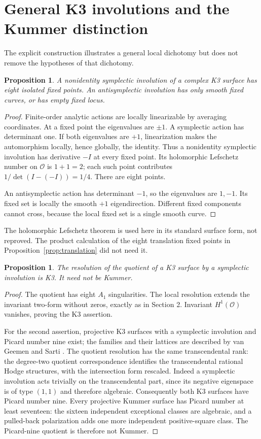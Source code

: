 \documentclass[11pt]{amsart}
\newtheorem{proposition}[theorem]{Proposition}
\theoremstyle{definition}
\begin{document}
\section{General K3 involutions and the Kummer distinction}\label{sec:general}
The explicit construction illustrates a general local dichotomy but
does not remove the hypotheses of that dichotomy.

\begin{proposition}\label{prop:local}
A nonidentity symplectic involution of a complex K3 surface has eight
isolated fixed points. An antisymplectic involution has only smooth
fixed curves, or has empty fixed locus.
\end{proposition}
\begin{proof}
Finite-order analytic actions are locally linearizable by averaging
coordinates. At a fixed point the eigenvalues are $\pm1$. A
symplectic action has determinant one. If both eigenvalues are $+1$,
linearization makes the automorphism locally, hence globally, the
identity. Thus a nonidentity symplectic involution has derivative
$-I$ at every fixed point. Its holomorphic Lefschetz number on
$\mathcal O$ is $1+1=2$; each such point contributes
$1/\det(I-(-I))=1/4$. There are eight points.

An antisymplectic action has determinant $-1$, so the eigenvalues are
$1,-1$. Its fixed set is locally the smooth $+1$ eigendirection.
Different fixed components cannot cross, because the local fixed set
is a single smooth curve.
\end{proof}

The holomorphic Lefschetz theorem is used here in its standard
surface form, not reproved. The product calculation of the eight
translation fixed points in Proposition~\ref{prop:translation} did not
need it.

\begin{proposition}\label{prop:notkummer}
The resolution of the quotient of a K3 surface by a symplectic
involution is K3. It need not be Kummer.
\end{proposition}
\begin{proof}
The quotient has eight $A_1$ singularities. The local resolution
extends the invariant two-form without zeros, exactly as in Section 2.
Invariant $H^1(\mathcal O)$ vanishes, proving the K3 assertion.

For the second assertion, projective K3 surfaces with a symplectic
involution and Picard number nine exist; the families and their
lattices are described by van Geemen and Sarti \cite{vGS}.
The quotient resolution has the same transcendental rank: the
degree-two quotient correspondence identifies the transcendental
rational Hodge structures, with the intersection form rescaled.
Indeed a symplectic involution acts trivially on the transcendental
part, since its negative eigenspace is of type $(1,1)$ and therefore
algebraic. Consequently both K3 surfaces have Picard number nine.
Every projective Kummer surface has Picard number at least seventeen:
the sixteen independent exceptional classes are algebraic, and a
pulled-back polarization adds one more independent positive-square
class. The Picard-nine quotient is therefore not Kummer.
\end{proof}
\end{document}
